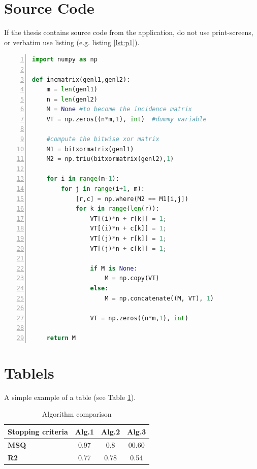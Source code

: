 \documentclass[12pt,a4paper]{book}
\theoremstyle{definition}
\theoremstyle{remark}
\begin{document}
\section{Source Code}
If the thesis contains source code from the application, do not use print-screens, or verbatim  use listing  (e.g. listing \ref{lst:p1}). 

\begin{lstlisting}[language=Python, numbers=left,
    stepnumber=1, caption=An exemple of Python code, label=lst:p1]
import numpy as np
    
def incmatrix(genl1,genl2):
    m = len(genl1)
    n = len(genl2)
    M = None #to become the incidence matrix
    VT = np.zeros((n*m,1), int)  #dummy variable
    
    #compute the bitwise xor matrix
    M1 = bitxormatrix(genl1)
    M2 = np.triu(bitxormatrix(genl2),1) 

    for i in range(m-1):
        for j in range(i+1, m):
            [r,c] = np.where(M2 == M1[i,j])
            for k in range(len(r)):
                VT[(i)*n + r[k]] = 1;
                VT[(i)*n + c[k]] = 1;
                VT[(j)*n + r[k]] = 1;
                VT[(j)*n + c[k]] = 1;
                
                if M is None:
                    M = np.copy(VT)
                else:
                    M = np.concatenate((M, VT), 1)
                
                VT = np.zeros((n*m,1), int)
    
    return M
\end{lstlisting}

\section{Tablels}

A simple example of a table (see Table \ref{tab:my_tabel}). 

\begin{table}[!ht]
    \centering
    \begin{tabular}{|l | c |  c | c |} 
 \hline
 Stopping criteria & \textbf{Alg.1} & \textbf{Alg.2} & \textbf{Alg.3} \\  
 \hline\hline
\textbf{ MSQ} & 0.97 & 0.8 & 00.60 \\ 
 \hline
 \textbf{R2} & 0.77 & 0.78 & 0.54 \\
 \hline
 
 \hline
\end{tabular}
    \caption{Algorithm comparison}
    \label{tab:my_tabel}
\end{table}
\end{document}
